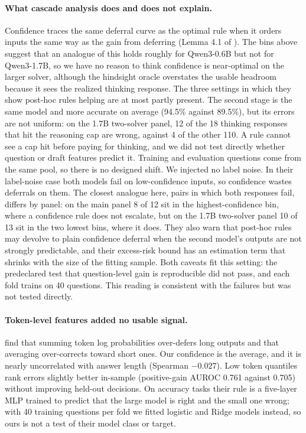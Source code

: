 \documentclass[10pt,letterpaper]{article}
\begin{document}
\paragraph{What cascade analysis does and does not explain.} Confidence traces the same deferral curve as the optimal rule when it orders inputs the same way as the gain from deferring (Lemma 4.1 of \citet{jitkrittum2023cascade}). The bins above suggest that an analogue of this holds roughly for Qwen3-0.6B but not for Qwen3-1.7B, so we have no reason to think confidence is near-optimal on the larger solver, although the hindsight oracle overstates the usable headroom because it sees the realized thinking response. The three settings in which they show post-hoc rules helping are at most partly present. The second stage is the same model and more accurate on average (94.5\% against 89.5\%), but its errors are not uniform: on the 1.7B two-solver panel, 12 of the 18 thinking responses that hit the reasoning cap are wrong, against 4 of the other 110. A rule cannot see a cap hit before paying for thinking, and we did not test directly whether question or draft features predict it. Training and evaluation questions come from the same pool, so there is no designed shift. We injected no label noise. In their label-noise case both models fail on low-confidence inputs, so confidence wastes deferrals on them. The closest analogue here, pairs in which both responses fail, differs by panel: on the main panel 8 of 12 sit in the highest-confidence bin, where a confidence rule does not escalate, but on the 1.7B two-solver panel 10 of 13 sit in the two lowest bins, where it does. They also warn that post-hoc rules may devolve to plain confidence deferral when the second model's outputs are not strongly predictable, and their excess-risk bound has an estimation term that shrinks with the size of the fitting sample. Both caveats fit this setting: the predeclared test that question-level gain is reproducible did not pass, and each fold trains on 40 questions. This reading is consistent with the failures but was not tested directly.

\paragraph{Token-level features added no usable signal.} \citet{gupta2024lmcascades} find that summing token log probabilities over-defers long outputs and that averaging over-corrects toward short ones. Our confidence is the average, and it is nearly uncorrelated with answer length (Spearman $-0.027$). Low token quantiles rank errors slightly better in-sample (positive-gain AUROC 0.761 against 0.705) without improving held-out decisions. On accuracy tasks their rule is a five-layer MLP trained to predict that the large model is right and the small one wrong; with 40 training questions per fold we fitted logistic and Ridge models instead, so ours is not a test of their model class or target.
\end{document}
